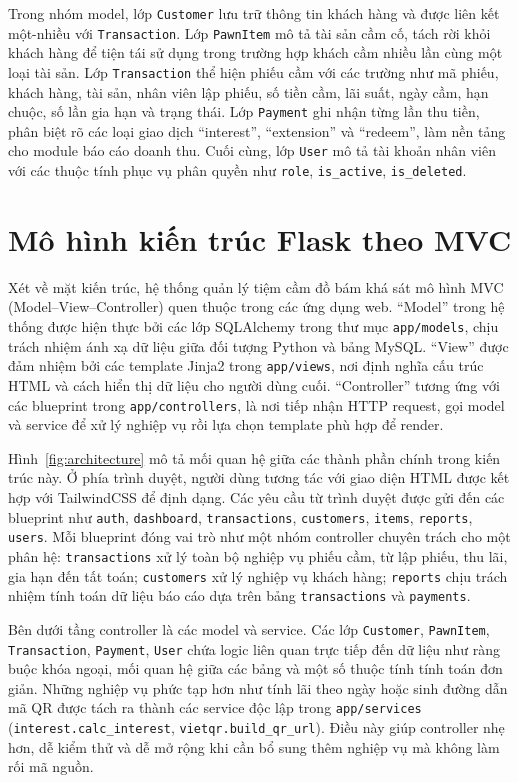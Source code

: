 \documentclass[13pt,a4paper]{extreport}
\begin{document}
Trong nhóm model, lớp \texttt{Customer} lưu trữ thông tin khách hàng và được liên kết một-nhiều với \texttt{Transaction}. Lớp \texttt{PawnItem} mô tả tài sản cầm cố, tách rời khỏi khách hàng để tiện tái sử dụng trong trường hợp khách cầm nhiều lần cùng một loại tài sản. Lớp \texttt{Transaction} thể hiện phiếu cầm với các trường như mã phiếu, khách hàng, tài sản, nhân viên lập phiếu, số tiền cầm, lãi suất, ngày cầm, hạn chuộc, số lần gia hạn và trạng thái. Lớp \texttt{Payment} ghi nhận từng lần thu tiền, phân biệt rõ các loại giao dịch ``interest'', ``extension'' và ``redeem'', làm nền tảng cho module báo cáo doanh thu. Cuối cùng, lớp \texttt{User} mô tả tài khoản nhân viên với các thuộc tính phục vụ phân quyền như \texttt{role}, \texttt{is\_active}, \texttt{is\_deleted}.

\section{Mô hình kiến trúc Flask theo MVC}

Xét về mặt kiến trúc, hệ thống quản lý tiệm cầm đồ bám khá sát mô hình MVC (Model--View--Controller) quen thuộc trong các ứng dụng web. ``Model'' trong hệ thống được hiện thực bởi các lớp SQLAlchemy trong thư mục \texttt{app/models}, chịu trách nhiệm ánh xạ dữ liệu giữa đối tượng Python và bảng MySQL. ``View'' được đảm nhiệm bởi các template Jinja2 trong \texttt{app/views}, nơi định nghĩa cấu trúc HTML và cách hiển thị dữ liệu cho người dùng cuối. ``Controller'' tương ứng với các blueprint trong \texttt{app/controllers}, là nơi tiếp nhận HTTP request, gọi model và service để xử lý nghiệp vụ rồi lựa chọn template phù hợp để render.

Hình~\ref{fig:architecture} mô tả mối quan hệ giữa các thành phần chính trong kiến trúc này. Ở phía trình duyệt, người dùng tương tác với giao diện HTML được kết hợp với TailwindCSS để định dạng. Các yêu cầu từ trình duyệt được gửi đến các blueprint như \texttt{auth}, \texttt{dashboard}, \texttt{transactions}, \texttt{customers}, \texttt{items}, \texttt{reports}, \texttt{users}. Mỗi blueprint đóng vai trò như một nhóm controller chuyên trách cho một phân hệ: \texttt{transactions} xử lý toàn bộ nghiệp vụ phiếu cầm, từ lập phiếu, thu lãi, gia hạn đến tất toán; \texttt{customers} xử lý nghiệp vụ khách hàng; \texttt{reports} chịu trách nhiệm tính toán dữ liệu báo cáo dựa trên bảng \texttt{transactions} và \texttt{payments}.

Bên dưới tầng controller là các model và service. Các lớp \texttt{Customer}, \texttt{PawnItem}, \texttt{Transaction}, \texttt{Payment}, \texttt{User} chứa logic liên quan trực tiếp đến dữ liệu như ràng buộc khóa ngoại, mối quan hệ giữa các bảng và một số thuộc tính tính toán đơn giản. Những nghiệp vụ phức tạp hơn như tính lãi theo ngày hoặc sinh đường dẫn mã QR được tách ra thành các service độc lập trong \texttt{app/services} (\texttt{interest.calc\_interest}, \texttt{vietqr.build\_qr\_url}). Điều này giúp controller nhẹ hơn, dễ kiểm thử và dễ mở rộng khi cần bổ sung thêm nghiệp vụ mà không làm rối mã nguồn.
\end{document}
